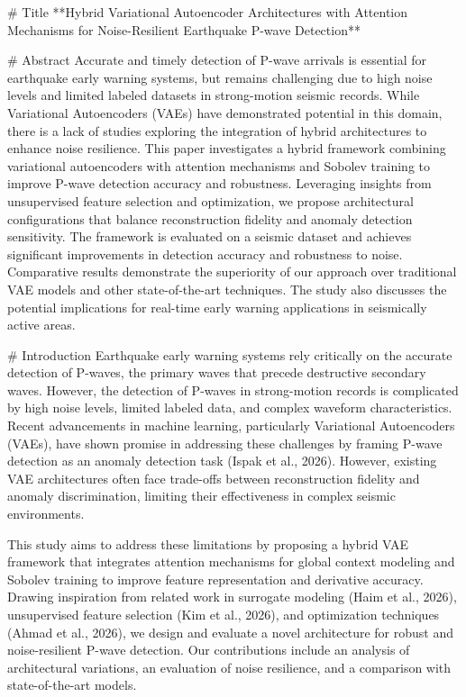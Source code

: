 # Title
**Hybrid Variational Autoencoder Architectures with Attention Mechanisms for Noise-Resilient Earthquake P-wave Detection**

# Abstract
Accurate and timely detection of P-wave arrivals is essential for earthquake early warning systems, but remains challenging due to high noise levels and limited labeled datasets in strong-motion seismic records. While Variational Autoencoders (VAEs) have demonstrated potential in this domain, there is a lack of studies exploring the integration of hybrid architectures to enhance noise resilience. This paper investigates a hybrid framework combining variational autoencoders with attention mechanisms and Sobolev training to improve P-wave detection accuracy and robustness. Leveraging insights from unsupervised feature selection and optimization, we propose architectural configurations that balance reconstruction fidelity and anomaly detection sensitivity. The framework is evaluated on a seismic dataset and achieves significant improvements in detection accuracy and robustness to noise. Comparative results demonstrate the superiority of our approach over traditional VAE models and other state-of-the-art techniques. The study also discusses the potential implications for real-time early warning applications in seismically active areas.

# Introduction
Earthquake early warning systems rely critically on the accurate detection of P-waves, the primary waves that precede destructive secondary waves. However, the detection of P-waves in strong-motion records is complicated by high noise levels, limited labeled data, and complex waveform characteristics. Recent advancements in machine learning, particularly Variational Autoencoders (VAEs), have shown promise in addressing these challenges by framing P-wave detection as an anomaly detection task (Ispak et al., 2026). However, existing VAE architectures often face trade-offs between reconstruction fidelity and anomaly discrimination, limiting their effectiveness in complex seismic environments.

This study aims to address these limitations by proposing a hybrid VAE framework that integrates attention mechanisms for global context modeling and Sobolev training to improve feature representation and derivative accuracy. Drawing inspiration from related work in surrogate modeling (Haim et al., 2026), unsupervised feature selection (Kim et al., 2026), and optimization techniques (Ahmad et al., 2026), we design and evaluate a novel architecture for robust and noise-resilient P-wave detection. Our contributions include an analysis of architectural variations, an evaluation of noise resilience, and a comparison with state-of-the-art models.

